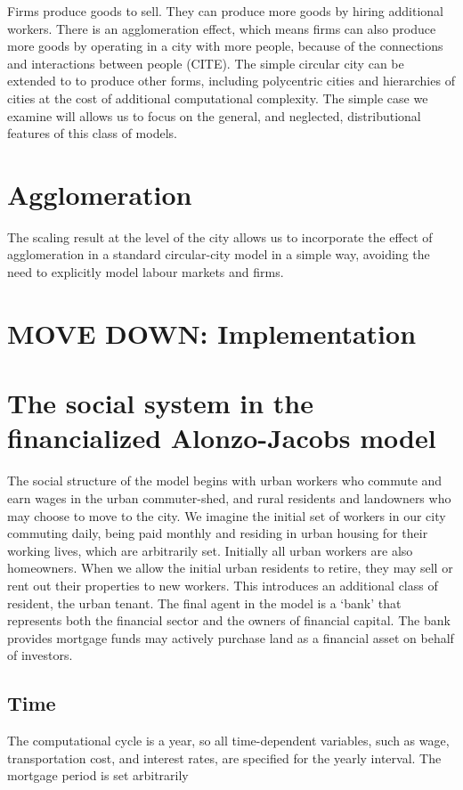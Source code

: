 Firms produce goods to sell. They can produce more goods by hiring additional workers. 
There is an agglomeration effect, which means firms can also produce more goods by operating in a city with more people, because of the connections and interactions between people (CITE). 
The simple circular city can be extended to to produce other forms, including polycentric cities and hierarchies of cities at the cost of additional computational complexity. The simple case we examine will allows us to focus on the general, and neglected, distributional features of this class of models.

\section{Agglomeration}
The  scaling result at the level of the city allows us to incorporate the effect of agglomeration in a standard  circular-city model in a simple way, avoiding the need to explicitly model labour markets and firms. %

\section{MOVE DOWN: Implementation} 
 \section{The social system in the financialized Alonzo-Jacobs model}
The social structure of the model begins with urban workers who commute and earn wages in the urban commuter-shed, and  rural residents and landowners who may choose to move to the city. 
We imagine the initial set of workers in our city commuting daily, being paid monthly and residing in urban housing for their working lives, which are arbitrarily set. Initially all urban workers are also homeowners. When we allow the initial urban residents to retire, they may sell or rent out their properties to new workers. This introduces an additional \gls{class} of resident, the urban tenant. The final agent in the model is a `bank' that represents both the financial sector and the owners of financial capital. The bank provides mortgage funds may  actively purchase land as a financial asset on behalf of investors.

\subsection{Time}
 The computational cycle is a year, so all time-dependent variables, such as wage, transportation cost, and interest rates, are specified for the yearly interval. The mortgage period is set arbitrarily 

